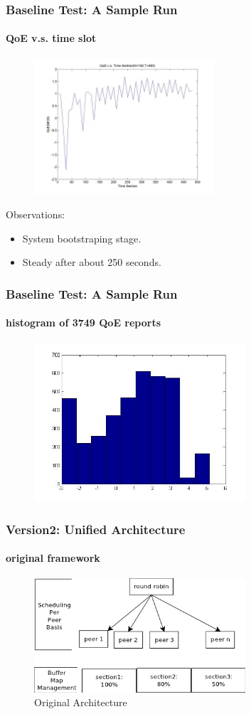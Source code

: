 \documentclass[14pt]{beamer}
\begin{document}
\begin{frame}
\frametitle{Baseline Test: A Sample Run}
\framesubtitle{QoE v.s. time slot}
\begin{figure}
	\includegraphics[width=0.6\textwidth]{../fig/time_qoe.jpg}
\end{figure}
Observations:
\begin{itemize}
	\item System bootstraping stage. 
	\item Steady after about 250 seconds. 
\end{itemize}
\end{frame}

\begin{frame}
\frametitle{Baseline Test: A Sample Run}
\framesubtitle{histogram of 3749 QoE reports}
\begin{figure}
	\includegraphics[width=0.7\textwidth]{../fig/qoe_hist.jpg}
\end{figure}
\end{frame}


\begin{frame}
\frametitle{Version2: Unified Architecture}
\framesubtitle{original framework}
\begin{figure}
	\includegraphics[width=0.7\textwidth]{../fig/arch_orig.png}
	\caption{Original Architecture}
\end{figure}
\end{frame}
\end{document}
